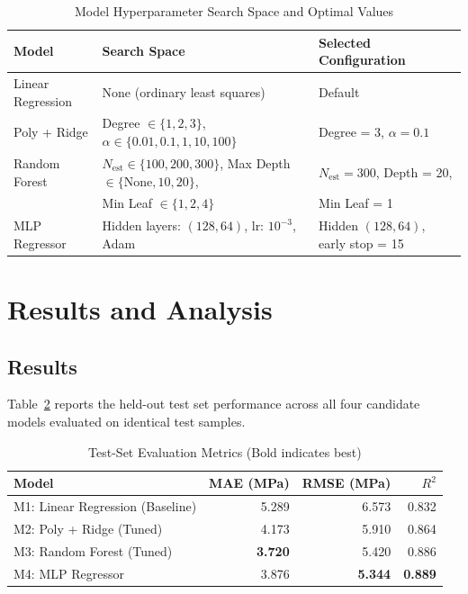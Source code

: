 \documentclass[conference]{IEEEtran}
\begin{document}
\begin{table}[htbp]
\caption{Model Hyperparameter Search Space and Optimal Values}
\label{tab:hyperparams}
\centering
\small
\begin{tabular}{lll}
\toprule
\textbf{Model} & \textbf{Search Space} & \textbf{Selected Configuration} \\
\midrule
Linear Regression & None (ordinary least squares) & Default \\
Poly + Ridge & Degree $\in \{1, 2, 3\}$, $\alpha \in \{0.01, 0.1, 1, 10, 100\}$ & Degree = 3, $\alpha = 0.1$ \\
Random Forest & $N_{\text{est}} \in \{100, 200, 300\}$, Max Depth $\in \{\text{None}, 10, 20\}$, & $N_{\text{est}} = 300$, Depth = 20, \\
              & Min Leaf $\in \{1, 2, 4\}$ & Min Leaf = 1 \\
MLP Regressor & Hidden layers: $(128, 64)$, lr: $10^{-3}$, Adam & Hidden $(128, 64)$, early stop = 15 \\
\bottomrule
\end{tabular}
\end{table}

\section{Results and Analysis}

\subsection{Results}
Table~\ref{tab:results} reports the held-out test set performance across all four candidate models evaluated on identical test samples.

\begin{table}[htbp]
\caption{Test-Set Evaluation Metrics (Bold indicates best)}
\label{tab:results}
\centering
\small
\begin{tabular}{lrrr}
\toprule
\textbf{Model} & \textbf{MAE (MPa)} & \textbf{RMSE (MPa)} & \textbf{$R^2$} \\
\midrule
M1: Linear Regression (Baseline) & 5.289 & 6.573 & 0.832 \\
M2: Poly + Ridge (Tuned)         & 4.173 & 5.910 & 0.864 \\
M3: Random Forest (Tuned)        & \textbf{3.720} & 5.420 & 0.886 \\
M4: MLP Regressor                & 3.876 & \textbf{5.344} & \textbf{0.889} \\
\bottomrule
\end{tabular}
\end{table}
\end{document}
